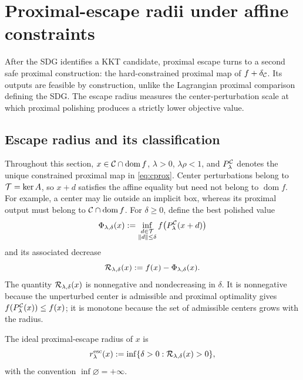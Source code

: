 \section{Proximal-escape radii under affine constraints}
\label{sec:escape}

After the SDG identifies a KKT candidate, proximal escape turns to a second
safe proximal construction: the hard-constrained proximal map of
\(f+\delta_{\mathcal{C}}\).  Its outputs are feasible by construction, unlike the
Lagrangian proximal comparison defining the SDG.  The escape radius measures
the center-perturbation scale at which proximal polishing produces a strictly
lower objective value.

\subsection{Escape radius and its classification}
\label{subsec:escape-profile}

Throughout this section, \(x\in\mathcal{C}\cap\operatorname{dom} f\), \(\lambda>0\),
\(\lambda\rho<1\), and \(P_\lambda^{\mathcal{C}}\) denotes the unique constrained
proximal map in \cref{eq:cprox}.  Center perturbations belong to
\(\mathcal{T}=\ker A\), so \(x+d\) satisfies the affine equality but need not
belong to \(\operatorname{dom}f\).  For example, a center may lie outside
an implicit box, whereas its proximal output must belong to
\(\mathcal{C}\cap\operatorname{dom}f\).
For \(\delta\ge0\), define the best polished value
\begin{equation}
  \Phi_{\lambda,\delta}(x)
  :=
  \inf_{\substack{d\in\mathcal{T}\\\left\lVert d\right\rVert\le\delta}}
  f\!\left(P_\lambda^{\mathcal{C}}(x+d)\right)
  \label{eq:escape-profile}
\end{equation}
and its associated decrease
\begin{equation}
  \mathcal{R}_{\lambda,\delta}(x)
  :=
  f(x)-\Phi_{\lambda,\delta}(x).
  \label{eq:prox-drop}
\end{equation}
The quantity \(\mathcal{R}_{\lambda,\delta}(x)\) is nonnegative and nondecreasing
in \(\delta\).  It is nonnegative because the unperturbed center is
admissible and proximal optimality gives
\(f(P_\lambda^{\mathcal{C}}(x))\le f(x)\); it is monotone because the set of
admissible centers grows with the radius.

\begin{definition}
  \label{def:escape-radius}
  The ideal proximal-escape radius of \(x\) is
  \begin{equation}
    r_{\lambda}^{\mathrm{esc}}(x)
    :=
    \inf\{\delta>0:
             \mathcal{R}_{\lambda,\delta}(x)>0\},
    \label{eq:escape-radius}
  \end{equation}
  with the convention \(\inf\varnothing=+\infty\).
\end{definition}

